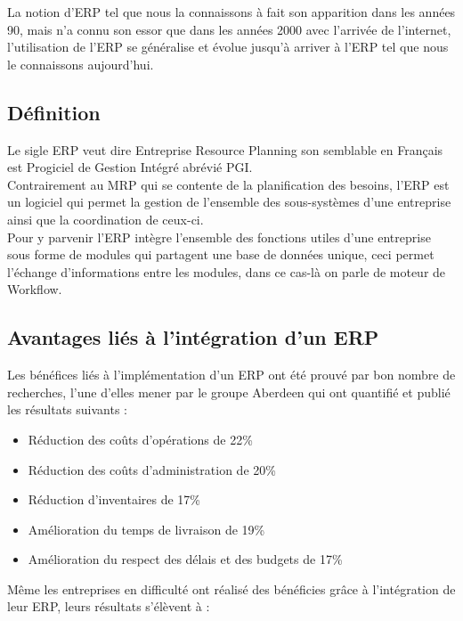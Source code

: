         La notion d’ERP tel que nous la connaissons à fait son apparition dans les années 90, mais n’a connu son essor que dans les années 2000 avec l’arrivée de l’internet, l’utilisation de l’ERP se généralise et évolue jusqu’à arriver à l’ERP tel que nous le connaissons aujourd’hui.
        
    \subsection{Définition}
        Le sigle ERP veut dire Entreprise Resource Planning son semblable en Français est Progiciel de Gestion Intégré abrévié PGI.\\

        Contrairement au MRP qui se contente de la planification des besoins, l’ERP est un logiciel qui permet la gestion de l’ensemble des sous-systèmes d’une entreprise ainsi que la coordination de ceux-ci.\\

        Pour y parvenir l’ERP intègre l’ensemble des fonctions utiles d’une entreprise sous forme de modules qui partagent une base de données unique, ceci permet l’échange d’informations entre les modules, dans ce cas-là on parle de moteur de Workflow.
        
    \subsection{Avantages liés à l’intégration d’un ERP}
        Les bénéfices liés à l’implémentation d’un ERP ont été prouvé par bon nombre de recherches, l’une d’elles mener par le groupe Aberdeen qui ont quantifié et publié les résultats suivants :\\

        \begin{itemize}
            \item Réduction des coûts d’opérations de 22\%
            \item Réduction des coûts d’administration de 20\%
            \item Réduction d’inventaires de 17\%
            \item Amélioration du temps de livraison de 19\%
            \item Amélioration du respect des délais et des budgets de 17\%\\
        \end{itemize}

        Même les entreprises en difficulté ont réalisé des bénéficies grâce à l’intégration de leur ERP, leurs résultats s’élèvent à :\\

